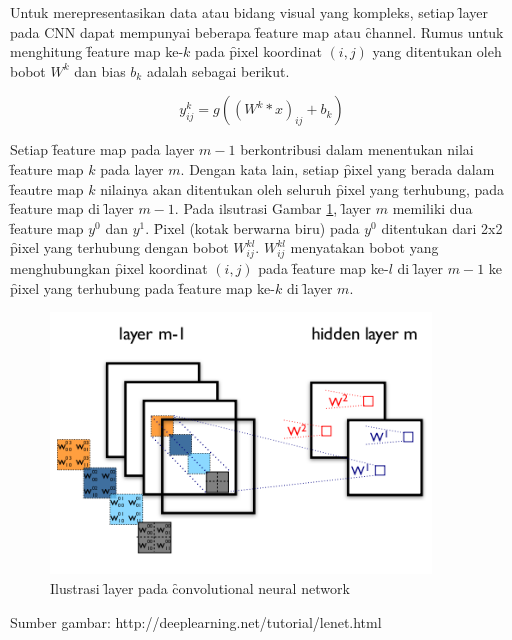 Untuk merepresentasikan data atau bidang visual yang kompleks, setiap \f{layer} pada CNN dapat mempunyai beberapa \f{feature map} atau \f{channel}. Rumus untuk menghitung \f{feature map} ke-$k$ pada \f{pixel} koordinat $(i,j)$ yang ditentukan oleh bobot $W^{k}$ dan bias $b_{k}$ adalah sebagai berikut.

\begin{equation}
\label{equ:featuremap}
y^{k}_{ij} = g\left((W^{k} * x)_{ij} + b_{k}\right)
\end{equation}

Setiap \f{feature map} pada layer $m - 1$ berkontribusi dalam menentukan nilai \f{feature map} $k$ pada layer $m$. Dengan kata lain, setiap \f{pixel} yang berada dalam \f{feautre map} $k$ nilainya akan ditentukan oleh seluruh \f{pixel} yang terhubung, pada \f{feature map} di \f{layer} $m - 1$. Pada ilsutrasi Gambar \ref{fig:featuremap}, \f{layer} $m$ memiliki dua \f{feature map} $y^0$ dan $y^1$. \f{Pixel} (kotak berwarna biru) pada $y^0$ ditentukan dari 2x2 \f{pixel} yang terhubung dengan bobot $W^{kl}_{ij}$. $W^{kl}_{ij}$ menyatakan bobot yang menghubungkan \f{pixel} koordinat $(i,j)$ pada \f{feature map} ke-$l$ di \f{layer} $m - 1$ ke \f{pixel} yang terhubung pada \f{feature map} ke-$k$ di \f{layer} $m$.

\begin{figure}
	\centering
	\includegraphics[width=0.9\textwidth,height=0.55\textwidth]
	{pics/featuremap.png}
	\caption{Ilustrasi \f{layer} pada \f{convolutional neural network}}
	\label{fig:featuremap}
\end{figure}
\vspace{-1.2cm}
\begin{center}
	{\small Sumber gambar: http://deeplearning.net/tutorial/lenet.html}
\end{center}

